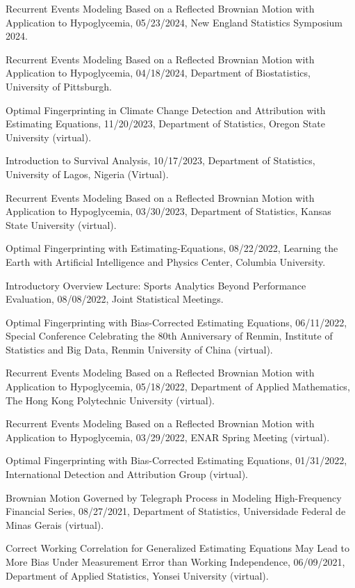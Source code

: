 \documentclass[Statistics]{vita}
\begin{document}
\begin{vita}
\begin{InvitedTalks}
  \item Recurrent Events Modeling Based on a Reflected Brownian Motion with Application to Hypoglycemia, 05/23/2024, New England Statistics Symposium 2024.
  \item Recurrent Events Modeling Based on a Reflected Brownian Motion with Application to Hypoglycemia, 04/18/2024, Department of Biostatistics, University of Pittsburgh.
  \item Optimal Fingerprinting in Climate Change Detection and Attribution with Estimating Equations, 11/20/2023, Department of Statistics, Oregon State University (virtual).
  \item Introduction to Survival Analysis, 10/17/2023, Department of Statistics, University of Lagos, Nigeria (Virtual).
  \item Recurrent Events Modeling Based on a Reflected Brownian Motion with Application to Hypoglycemia, 03/30/2023, Department of Statistics, Kansas State University (virtual).
  \item Optimal Fingerprinting with Estimating-Equations, 08/22/2022, Learning the Earth with Artificial Intelligence and Physics Center, Columbia University.
  \item Introductory Overview Lecture: Sports Analytics Beyond Performance Evaluation, 08/08/2022, Joint Statistical Meetings.
  \item Optimal Fingerprinting with Bias-Corrected Estimating Equations, 06/11/2022, Special Conference Celebrating the 80th Anniversary of Renmin, Institute of Statistics and Big Data, Renmin University of China (virtual).
  \item Recurrent Events Modeling Based on a Reflected Brownian Motion with Application to Hypoglycemia, 05/18/2022, Department of Applied Mathematics, The Hong Kong Polytechnic University (virtual).
  \item Recurrent Events Modeling Based on a Reflected Brownian Motion with Application to Hypoglycemia, 03/29/2022, ENAR Spring Meeting (virtual).
  \item Optimal Fingerprinting with Bias-Corrected Estimating Equations, 01/31/2022, International Detection and Attribution Group (virtual).
  \item Brownian Motion Governed by Telegraph Process in Modeling High-Frequency Financial Series, 08/27/2021, Department of Statistics, Universidade Federal de Minas Gerais (virtual).
  \item Correct Working Correlation for Generalized Estimating Equations May Lead to More Bias Under Measurement Error than Working Independence, 06/09/2021, Department of Applied Statistics, Yonsei University (virtual).

\end{InvitedTalks}
\end{vita}
\end{document}

